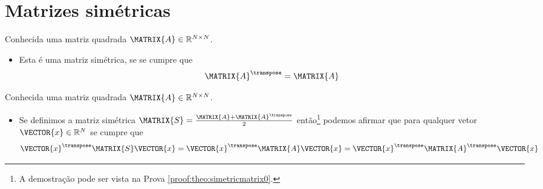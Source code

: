 \section{ Matrizes simétricas}


\begin{definition}\label{def:symmetricmatrix0}
Conhecida uma matriz quadrada $\MATRIX{A} \in \mathbb{R}^{N \times N}$. 
\begin{itemize}
\item Esta é uma matriz simétrica, se se cumpre que \cite[pp. 18]{golub2013matrix} 
\begin{equation}
\MATRIX{A}^{\transpose} = \MATRIX{A}
\end{equation}
\end{itemize}
\end{definition}

\begin{theorem}\label{theo:simetricmatrix0}
Conhecida uma matriz quadrada $\MATRIX{A} \in \mathbb{R}^{N \times N}$.
\begin{itemize}
\item Se definimos a matriz simétrica $\MATRIX{S}=\frac{\MATRIX{A}+\MATRIX{A}^{\transpose}}{2}$ então\footnote{A
demostração pode ser vista na Prova \ref{proof:theo:simetricmatrix0}.} 
podemos afirmar que para qualquer vetor $\VECTOR{x} \in \mathbb{R}^{N}$ se cumpre que 
\begin{equation}
\VECTOR{x}^{\transpose}\MATRIX{S}\VECTOR{x} = 
\VECTOR{x}^{\transpose}\MATRIX{A}\VECTOR{x} =
\VECTOR{x}^{\transpose}\MATRIX{A}^{\transpose}\VECTOR{x}
\end{equation}
\end{itemize}
\end{theorem}


